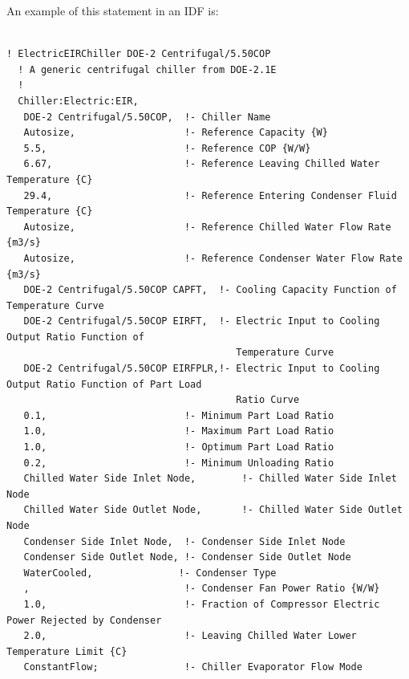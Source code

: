 An example of this statement in an IDF is:

\begin{lstlisting}

! ElectricEIRChiller DOE-2 Centrifugal/5.50COP
  ! A generic centrifugal chiller from DOE-2.1E
  !
  Chiller:Electric:EIR,
   DOE-2 Centrifugal/5.50COP,  !- Chiller Name
   Autosize,                   !- Reference Capacity {W}
   5.5,                        !- Reference COP {W/W}
   6.67,                       !- Reference Leaving Chilled Water Temperature {C}
   29.4,                       !- Reference Entering Condenser Fluid Temperature {C}
   Autosize,                   !- Reference Chilled Water Flow Rate {m3/s}
   Autosize,                   !- Reference Condenser Water Flow Rate {m3/s}
   DOE-2 Centrifugal/5.50COP CAPFT,  !- Cooling Capacity Function of Temperature Curve
   DOE-2 Centrifugal/5.50COP EIRFT,  !- Electric Input to Cooling Output Ratio Function of
                                        Temperature Curve
   DOE-2 Centrifugal/5.50COP EIRFPLR,!- Electric Input to Cooling Output Ratio Function of Part Load
                                        Ratio Curve
   0.1,                        !- Minimum Part Load Ratio
   1.0,                        !- Maximum Part Load Ratio
   1.0,                        !- Optimum Part Load Ratio
   0.2,                        !- Minimum Unloading Ratio
   Chilled Water Side Inlet Node,        !- Chilled Water Side Inlet Node
   Chilled Water Side Outlet Node,       !- Chilled Water Side Outlet Node
   Condenser Side Inlet Node,  !- Condenser Side Inlet Node
   Condenser Side Outlet Node, !- Condenser Side Outlet Node
   WaterCooled,               !- Condenser Type
   ,                           !- Condenser Fan Power Ratio {W/W}
   1.0,                        !- Fraction of Compressor Electric Power Rejected by Condenser
   2.0,                        !- Leaving Chilled Water Lower Temperature Limit {C}
   ConstantFlow;               !- Chiller Evaporator Flow Mode



\end{lstlisting}

